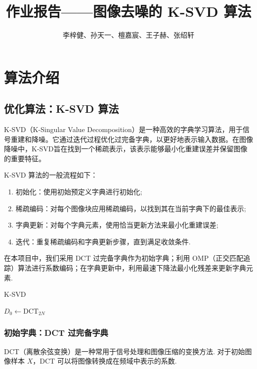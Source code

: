 \documentclass[a4paper,11pt]{article}
\title{\bf 作业报告——图像去噪的 K-SVD 算法}
\author{李梓健、孙天一、檀嘉宸、王子赫、张绍轩}
\date{}
\begin{document}
\maketitle





\section{算法介绍}

\subsection{优化算法：K-SVD 算法}
K-SVD（K-Singular Value Decomposition）是一种高效的字典学习算法，用于信号重建和降噪。它通过迭代过程优化过完备字典，以更好地表示输入数据。在图像降噪中，K-SVD旨在找到一个稀疏表示，该表示能够最小化重建误差并保留图像的重要特征。

K-SVD 算法的一般流程如下：
\begin{enumerate}
	\item 初始化：使用初始预定义字典进行初始化;
	\item 稀疏编码：对每个图像块应用稀疏编码，以找到其在当前字典下的最佳表示;
	\item 字典更新：对每个字典元素，使用恰当更新方法来最小化重建误差;
	\item 迭代：重复稀疏编码和字典更新步骤，直到满足收敛条件. 
\end{enumerate}

在本项目中，我们采用 DCT 过完备字典作为初始字典；利用 OMP（正交匹配追踪）算法进行系数编码；在字典更新中，利用最速下降法最小化残差来更新字典元素.
 
\begin{algorithm}[H]
	\caption{K-SVD}
	\label{alg:ksvd}
	
	
	$D_0 \gets \mathrm{DCT}_{2N}$ 
\end{algorithm}

\subsubsection{初始字典：DCT 过完备字典}
DCT（离散余弦变换）是一种常用于信号处理和图像压缩的变换方法.  对于初始图像样本 $X$，DCT 可以将图像转换成在频域中表示的系数. 
\end{document}
